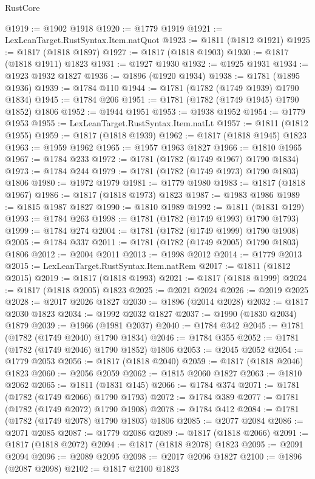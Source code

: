 \begin{lexlean}{RustCore}
\begin{coremodule}
@1919 := @1902 @1918
@1920 := @1779 @1919
@1921 := LexLeanTarget.RustSyntax.Item.natQuot
@1923 := @1811 (@1812 @1921)
@1925 := @1817 (@1818 @1897)
@1927 := @1817 (@1818 @1903)
@1930 := @1817 (@1818 @1911) @1823
@1931 := @1927 @1930
@1932 := @1925 @1931
@1934 := @1923 @1932 @1827
@1936 := @1896 (@1920 @1934)
@1938 := @1781 (@1895 @1936)
@1939 := @1784 @110
@1944 := @1781 (@1782 (@1749 @1939) @1790 @1834)
@1945 := @1784 @206
@1951 := @1781 (@1782 (@1749 @1945) @1790 @1852) @1806
@1952 := @1944 @1951
@1953 := @1938 @1952
@1954 := @1779 @1953
@1955 := LexLeanTarget.RustSyntax.Item.natLt
@1957 := @1811 (@1812 @1955)
@1959 := @1817 (@1818 @1939)
@1962 := @1817 (@1818 @1945) @1823
@1963 := @1959 @1962
@1965 := @1957 @1963 @1827
@1966 := @1810 @1965
@1967 := @1784 @233
@1972 := @1781 (@1782 (@1749 @1967) @1790 @1834)
@1973 := @1784 @244
@1979 := @1781 (@1782 (@1749 @1973) @1790 @1803) @1806
@1980 := @1972 @1979
@1981 := @1779 @1980
@1983 := @1817 (@1818 @1967)
@1986 := @1817 (@1818 @1973) @1823
@1987 := @1983 @1986
@1989 := @1815 @1987 @1827
@1990 := @1810 @1989
@1992 := @1811 (@1831 @129)
@1993 := @1784 @263
@1998 := @1781 (@1782 (@1749 @1993) @1790 @1793)
@1999 := @1784 @274
@2004 := @1781 (@1782 (@1749 @1999) @1790 @1908)
@2005 := @1784 @337
@2011 := @1781 (@1782 (@1749 @2005) @1790 @1803) @1806
@2012 := @2004 @2011
@2013 := @1998 @2012
@2014 := @1779 @2013
@2015 := LexLeanTarget.RustSyntax.Item.natRem
@2017 := @1811 (@1812 @2015)
@2019 := @1817 (@1818 @1993)
@2021 := @1817 (@1818 @1999)
@2024 := @1817 (@1818 @2005) @1823
@2025 := @2021 @2024
@2026 := @2019 @2025
@2028 := @2017 @2026 @1827
@2030 := @1896 (@2014 @2028)
@2032 := @1817 @2030 @1823
@2034 := @1992 @2032 @1827
@2037 := @1990 (@1830 @2034) @1879
@2039 := @1966 (@1981 @2037)
@2040 := @1784 @342
@2045 := @1781 (@1782 (@1749 @2040) @1790 @1834)
@2046 := @1784 @355
@2052 := @1781 (@1782 (@1749 @2046) @1790 @1852) @1806
@2053 := @2045 @2052
@2054 := @1779 @2053
@2056 := @1817 (@1818 @2040)
@2059 := @1817 (@1818 @2046) @1823
@2060 := @2056 @2059
@2062 := @1815 @2060 @1827
@2063 := @1810 @2062
@2065 := @1811 (@1831 @145)
@2066 := @1784 @374
@2071 := @1781 (@1782 (@1749 @2066) @1790 @1793)
@2072 := @1784 @389
@2077 := @1781 (@1782 (@1749 @2072) @1790 @1908)
@2078 := @1784 @412
@2084 := @1781 (@1782 (@1749 @2078) @1790 @1803) @1806
@2085 := @2077 @2084
@2086 := @2071 @2085
@2087 := @1779 @2086
@2089 := @1817 (@1818 @2066)
@2091 := @1817 (@1818 @2072)
@2094 := @1817 (@1818 @2078) @1823
@2095 := @2091 @2094
@2096 := @2089 @2095
@2098 := @2017 @2096 @1827
@2100 := @1896 (@2087 @2098)
@2102 := @1817 @2100 @1823

\end{coremodule}
\end{lexlean}
